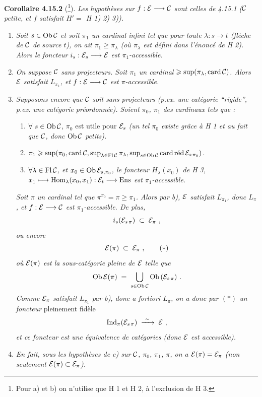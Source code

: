 
\textbf{Corollaire 4.15.2} (\footnote{Pour a) et b) on n'utilise que H 1 et H 2, à l'exclusion de H 3.}). \textit{Les hypothèses sur $f : \cE \longrightarrow \cC$ sont celles de 4.15.1 ($\cC$ petite, et $f$ satisfait $H' =$ H 1) 2) 3)).}
\begin{enumerate}
\item[\textit{a)}] \textit{Soit $s \in \Ob\cC$ et soit $\pi_1$ un cardinal infini tel que pour toute $\lambda : s \longrightarrow t$ (flèche de $\cC$ de source $t$), on ait $\pi_1 \geqslant \pi_\lambda$ (où $\pi_\lambda$ est défini dans l'énoncé de H 2). Alors le foncteur $i_s : \cE_s \longrightarrow \cE$ est $\pi_1$-accessible.} %
\item[\textit{b)}] \textit{On suppose $\cC$ sans projecteurs. Soit $\pi_1$ un cardinal $\geqslant \sup(\pi_\lambda, \card\cC)$. Alors $\cE$ satisfait $L_{\pi_1}$, et $f : \cE \longrightarrow \cC$ est $\pi$-accessible.}
\item[\textit{c)}] \textit{Supposons encore que $\cC$ soit sans projecteurs (p.ex. une catégorie ``rigide'', p.ex. une catégorie préordonnée). Soient $\pi_0$, $\pi_1$ des cardinaux tels que :}
\begin{enumerate}
\item[\textcircled{\footnotesize $1^o$}] $\forall\ s \in \Ob\cC$, $\pi_0$ est utile pour $\cE_s$ \textit{(un tel $\pi_0$ existe grâce à H 1 et au fait que $\cC$, donc $\Ob\cC$ petits).}
\item[\textcircled{\footnotesize $2^o$}] $\pi_1 \geqslant \sup(\pi_0, \card\cC, \sup_{\lambda\in\Fl\cC}\pi_\lambda, \sup_{s\in\Ob\cC} \cardred \cE_{s\,\pi_0})$.
\item[\textcircled{\footnotesize $3^o$}] \textit{$\forall\lambda \in \Fl\cC$, et $x_0 \in \Ob\cE_{s,\pi_0}$, le foncteur $H_\lambda(x_0)$ de H 3, $x_1 \longmapsto \Hom_\lambda(x_0,x_1) : \cE_t \longrightarrow \Ens$ est $\pi_1$-accessible.}
\end{enumerate}
\textit{Soit $\pi$ un cardinal tel que $\pi^{\pi_0} = \pi \geqslant \pi_1$. Alors par b), $\cE$ satisfait $L_{\pi_1}$, donc $L_\pi$, et $f : \cE \longrightarrow \cC$ est $\pi_1$-accessible. De plus,}
\[
i_s(\cE_{s\,\pi}) \;\subset\; \cE_\pi\ ,
\]
\textit{ou encore}
\[
\cE(\pi) \;\subset\; \cE_\pi\ , \tag*{$(*)$}
\]
\textit{où $\cE(\pi)$ est la sous-catégorie pleine de $\cE$ telle que}
\[
\Ob\cE(\pi) \;=\; \bigcup_{s\in\Ob\cC} \Ob\,(\cE_{s\,\pi})\ .
\]
\textit{Comme $\cE_\pi$ satisfait $L_{\pi_1}$ par b), donc a fortiori $L_\pi$, on a donc par $(*)$ un foncteur} pleinement fidèle
\[
\Ind_\pi(\cE_{s\,\pi}) \;\xrightarrow{\ \sim\ }\; \cE\ ,
\]
\textit{et ce foncteur est une équivalence de catégories (donc $\cE$ est accessible).}
\item[\textit{d)}] \textit{En fait, sous les hypothèses de c) sur $\cC$, $\pi_0$, $\pi_1$, $\pi$, on a $\cE(\pi) = \cE_\pi$ (non seulement $\cE(\pi) \subset \cE_\pi$).}
\end{enumerate}

